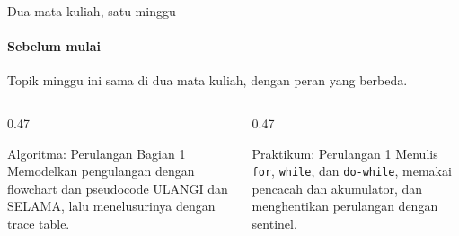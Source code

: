\documentclass[t]{beamer}
\begin{document}

\begin{frame}{Dua mata kuliah, satu minggu}
\framesubtitle{Sebelum mulai}
Topik minggu ini sama di dua mata kuliah, dengan peran yang berbeda.
\vspace{10pt}

\begin{columns}[T]
\begin{column}{0.47\textwidth}
\begin{Blok}{Algoritma: Perulangan Bagian 1}
Memodelkan pengulangan dengan flowchart dan pseudocode ULANGI dan SELAMA, lalu menelusurinya dengan trace table.
\end{Blok}
\end{column}
\begin{column}{0.47\textwidth}
\begin{BlokGelap}{Praktikum: Perulangan 1}
Menulis \texttt{for}, \texttt{while}, dan \texttt{do-while}, memakai pencacah dan akumulator, dan menghentikan perulangan dengan sentinel.
\end{BlokGelap}
\end{column}
\end{columns}
\end{frame}
\end{document}
